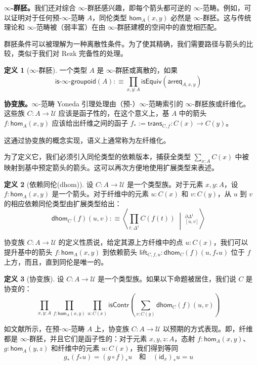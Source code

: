 \documentclass[12pt,a4paper]{article}
\theoremstyle{definition}
\newtheorem{definition}{定义}[section]
\theoremstyle{definition}
\begin{document}
\textbf{$\infty$-群胚。}我们还对综合 $\infty$-群胚感兴趣，即每个箭头都可逆的 $\infty$-范畴。例如，可以证明对于任何预-$\infty$-范畴 $A$，同伦类型 $\mathsf{hom}_A(x,y)$ 必然是 $\infty$-群胚。这与传统理论和 $\infty$-范畴被（弱丰富）在由 $\infty$-群胚建模的空间中的直觉相匹配。

群胚条件可以被理解为一种离散性条件。为了使其精确，我们需要路径与箭头的比较，类似于我们对 Rezk 完备性的处理。

\begin{definition}[$\infty$-群胚]
一个类型 $A$ 是 $\infty$-群胚或离散的，如果
\[
\mathsf{is\text{-}\infty\text{-}groupoid}(A) :\equiv \prod_{x,y:A} \mathsf{isEquiv}(\mathsf{arreq}_{A,x,y})
\]
\end{definition}

\textbf{协变族。}$\infty$-范畴 Yoneda 引理处理由（预-）$\infty$-范畴索引的 $\infty$-群胚族或纤维化。这些族 $C:A \to \mathcal{U}$ 应该是函子性的，在这个意义上，基 $A$ 中的箭头 $f:\mathsf{hom}_A(x,y)$ 应该给出纤维之间的函子 $f_* := \mathsf{trans}_{C,f}:C(x) \to C(y)$。

这通过协变族的概念实现，语义上通常称为左纤维化。

为了定义它，我们必须引入同伦类型的依赖版本，捕获全类型 $\sum_{x:A} C(x)$ 中被映射到基中预定箭头的箭头。这可以再次方便地使用扩展类型来表述。

\begin{definition}[依赖同伦(dhom)]
设 $C:A \to \mathcal{U}$ 是一个类型族。对于元素 $x,y:A$，设 $f:\mathsf{hom}_A(x,y)$ 是一个箭头。对于纤维中的元素 $u:C(x)$ 和 $v:C(y)$，从 $u$ 到 $v$ 的相应依赖同伦类型由扩展类型给出：
\[
\mathsf{dhom}_C(f)(u,v) :\equiv \left\langle \prod_{t:\Delta^1} C(f(t)) \; \middle| \; _{[u,v]}^{\partial\Delta^1} \right\rangle
\]
\end{definition}

协变族 $C:A \to \mathcal{U}$ 的定义性质说，给定其源上方纤维中的点 $u:C(x)$，我们可以提升基中的箭头 $f:\mathsf{hom}_A(x,y)$ 到依赖箭头 $\mathsf{lift}_{C,f,u}:\mathsf{dhom}_C(f)(u,f_*u)$ 位于 $f$ 上方，而且，直到同伦是唯一的。

\begin{definition}[协变族]
设 $C:A \to \mathcal{U}$ 是一个类型族。如果以下命题被居住，我们说 $C$ 是协变的：
\[
\prod_{x,y:A} \prod_{f:\mathsf{hom}_A(x,y)} \prod_{u:C(x)} \mathsf{isContr}\left(\sum_{v:C(y)} \mathsf{dhom}_C(f)(u,v)\right)
\]
\end{definition}

如文献所示，在预-$\infty$-范畴 $A$ 上，协变族 $C:A \to \mathcal{U}$ 以预期的方式表现。即，纤维都是 $\infty$-群胚，并且它们是函子性的：对于元素 $x,y,z:A$，态射 $f:\mathsf{hom}_A(x,y)$、$g:\mathsf{hom}_A(y,z)$ 和纤维中的元素 $u:C(x)$，我们得到等同
\[
g_*(f_*u) = (g \circ f)_*u \quad \text{和} \quad (\mathsf{id}_x)_*u = u
\]
\end{document}
